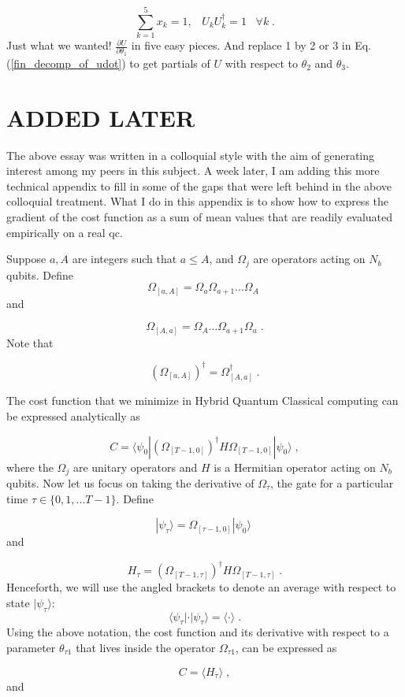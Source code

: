 \documentclass[12pt]{article}
\newcommand{\bra}[1]{\langle#1|}
\newcommand{\ket}[1]{|#1\rangle}
\newcommand{\beq}{\begin{equation}}
\newcommand{\eeq}{\end{equation}}
\begin{document}
{\begin{subequations}
\beq
\sum_{k=1}^5x_k=1,\;\;\;
U_kU_k^\dagger=1\;\;\;\forall k
\;.
\eeq
\end{subequations}
Just what we wanted!
$\frac{\partial U}{\partial \theta_1}$
in five easy pieces. And replace 1 by 2 or 3
in Eq.(\ref{fin_decomp_of_udot}) to get
partials of $U$ with respect to $\theta_2$
and $\theta_3$.

\section*{ADDED LATER}
The above essay was written in a colloquial style
with the aim of generating interest among
 my peers in this subject.
A week later, I am adding this more technical
appendix to
fill in some of the gaps that
were
left behind in the above colloquial treatment.
What I do in this appendix is to show how to
express the
gradient of the cost function as a sum of
mean values that are
readily evaluated empirically on a real qc.

Suppose $a, A$ are integers such that $a\leq A$,
and $\Omega_j$ are operators acting on $N_b$ qubits.
Define
\beq
\Omega_{[a,A]} = \Omega_a \Omega_{a+1}\ldots \Omega_{A}
\;
\eeq
and

\beq
\Omega_{[A,a]} = \Omega_A\ldots \Omega_{a+1} \Omega_{a}
\;.
\eeq
Note that

\beq
(\Omega_{[a, A]})^\dagger = \Omega^\dagger_{[A,a]}
\;.
\eeq

The cost function that we minimize
in Hybrid Quantum Classical computing
 can be expressed analytically as

\beq C = \bra{\psi_0}(\Omega_{[T-1,0]})^\dagger H
\Omega_{[T-1,0]}\ket{\psi_0}
\;,
\eeq
where the $\Omega_j$ are unitary operators
and $H$ is a Hermitian operator
acting on $N_b$ qubits. Now let us
focus on
taking the derivative of $\Omega_\tau$, the gate for a particular time
$\tau \in \{0,1, \ldots T-1\}$. Define

\beq
\ket{\psi_\tau} = \Omega_{[\tau-1, 0]}\ket{\psi_0}
\;
\eeq
and

\beq
H_\tau = (\Omega_{[T-1,\tau]})^\dagger H \Omega_{[T-1,\tau]}
\;.
\eeq
Henceforth,
we will
use the angled brackets to
 denote an average with respect to
state $\ket{\psi_\tau}$:
\beq
\bra{\psi_\tau}\cdot\ket{\psi_\tau}
=
\langle \cdot\rangle
\;.
\eeq
Using the above notation, the
cost function and its derivative
with respect to a parameter $\theta_{\tau 1}$
that lives inside the operator $\Omega_{\tau 1}$,
can be expressed as

\beq
C = \langle H_\tau\rangle
\;,
\eeq
and


}
\end{document}
